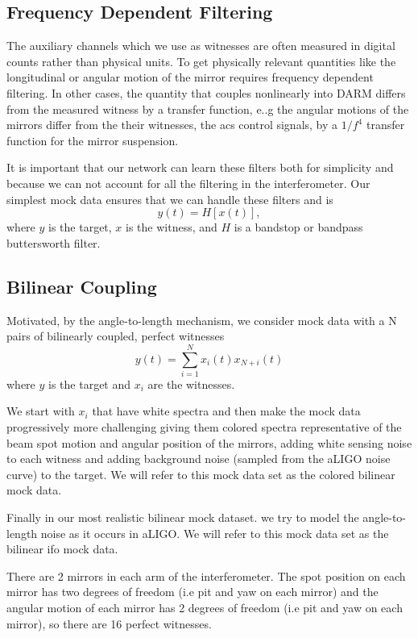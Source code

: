\begin{refsection}
\subsection{Frequency Dependent Filtering}
The auxiliary channels which we use as witnesses are often measured in digital counts rather than physical units. To get physically relevant quantities like the longitudinal or angular motion of the mirror requires frequency dependent filtering. In other cases, the quantity that couples nonlinearly into DARM differs from the measured witness by a transfer function, e..g the angular motions of the mirrors differ from the their witnesses, the acs control signals, by a $1/f^4$ transfer function for the mirror suspension. 

It is important that our network can learn these filters both for simplicity and because we can not account for all the filtering in the interferometer. Our simplest mock data ensures that we can handle these filters and is 
\begin{equation}
y(t)=H[x(t)],
\end{equation}
where $y$ is the target, $x$ is the witness, and $H$ is a bandstop or bandpass buttersworth filter.


\subsection{Bilinear Coupling}
Motivated, by the angle-to-length mechanism, we consider mock data with a N pairs of bilinearly coupled, perfect witnesses
\begin{equation}
y(t)=\sum_{i=1}^N x_i(t) x_{N+i}(t)
\end{equation}
where $y$ is the target and $x_i$ are the witnesses.

We start with $x_i$ that  have white spectra and then make the mock data progressively more challenging giving them colored spectra representative of the beam spot motion and angular position of the mirrors, adding white sensing noise to each witness and adding background noise (sampled from the aLIGO noise curve) to the target. We will refer to this mock data set as the colored bilinear mock data.

Finally in our most realistic bilinear mock dataset.  we try to model the angle-to-length noise as it occurs in aLIGO. We will refer to this mock data set as the bilinear ifo mock data.

There are 2 mirrors in each arm of the interferometer. The spot position on each mirror has two degrees of freedom (i.e pit and yaw on each mirror) and the angular motion of each mirror has 2 degrees of freedom (i.e pit and yaw on each mirror), so there are 16 perfect witnesses.


\end{refsection}
